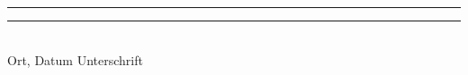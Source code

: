 \documentclass[
openright,
12pt, %
english,%
onehalfspacing, %
nolistspacing, %
nohyperref, %
headsepline, %
]{MastersDoctoralThesis} %
\begin{document}

  

 

\vspace{\fill}
\begin{flushleft}
\rule{5cm}{0.05cm} \hspace{\fill} \rule{5cm}{0.05cm} \\
Ort, Datum  \hspace{\fill} Unterschrift 
\end{flushleft}
\end{document}

